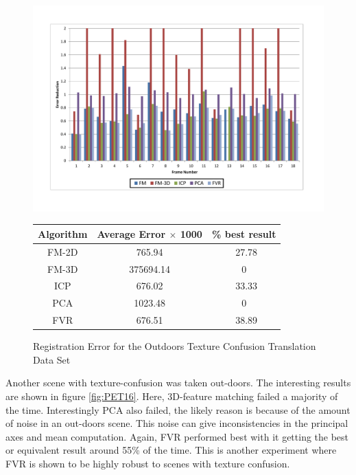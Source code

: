 \begin{figure}
\centering
\includegraphics[width=6in]{images/results/Outside_TextureConfusion_Translation}
\caption{Registration Error for the Outdoors Texture Confusion Translation Data Set}
\label{fig:PET16}

\begin{tabular}{ccc}
\hline
\textbf{Algorithm} & \textbf{Average Error $\times$ 1000} & \textbf{\% best result}\\ \hline
FM-2D	& 765.94 & ~27.78\\
FM-3D	& 375694.14 & 0\\
ICP		& 676.02 & ~33.33\\
PCA		& 1023.48 & 0\\
FVR		& 676.51 & ~38.89\\
\end{tabular}
\label{tab:PET16ST}
\end{figure}

Another scene with texture-confusion was taken out-doors. The interesting results are shown in figure \ref{fig:PET16}. Here, 3D-feature matching failed a majority of the time. Interestingly PCA also failed, the likely reason is because of the amount of noise in an out-doors scene. This noise can give inconsistencies in the principal axes and mean computation. Again, FVR performed best with it getting the best or equivalent result around 55\% of the time. This is another experiment where FVR is shown to be highly robust to scenes with texture confusion. 

